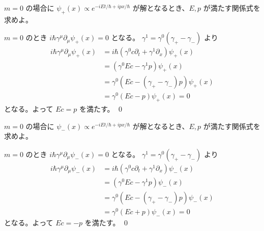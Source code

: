\documentclass[uplatex,dvipdfmx,a4paper,11pt]{jlreq}
\makeatletter
\numberwithin{equation}{section}
\theoremstyle{definition}
\renewenvironment{proof}[1][\proofname]{\par
  \normalfont
  \topsep6\p@\@plus6\p@ \trivlist
  \item[\hskip\labelsep{\bfseries #1}\@addpunct{\bfseries}]\ignorespaces\quad\par
}{%
  \qed\endtrivlist\@endpefalse
}
\renewcommand\proofname{証明}
\makeatother
\begin{document}
\begin{problem}
$m = 0$ の場合に $\psi_+(x) \propto e^{-iEt/\hbar+ipx/\hbar}$ が解となるとき、$E, p$ が満たす関係式を求めよ。
\end{problem}
\begin{proof}
  $m = 0$ のとき $i\hbar\gamma^\mu\partial_\mu\psi_+(x) = 0$ となる。 $\gamma^1 = \gamma^0(\gamma_+ - \gamma_-)$ より
  \begin{align}
    i\hbar\gamma^\mu\partial_\mu\psi_+(x) & = i\hbar(\gamma^0c\partial_t + \gamma^1\partial_x)\psi_+(x) \\
                                          & = (\gamma^0Ec - \gamma^1p)\psi_+(x)                         \\
                                          & = \gamma^0(Ec - (\gamma_+ - \gamma_-)p)\psi_+(x)            \\
                                          & = \gamma^0(Ec - p)\psi_+(x) = 0
  \end{align}
  となる。よって $Ec = p$ を満たす。
\end{proof}

\begin{problem}
$m = 0$ の場合に $\psi_-(x) \propto e^{-iEt/\hbar+ipx/\hbar}$ が解となるとき、$E, p$ が満たす関係式を求めよ。
\end{problem}
\begin{proof}
  $m = 0$ のとき $i\hbar\gamma^\mu\partial_\mu\psi_-(x) = 0$ となる。 $\gamma^1 = \gamma^0(\gamma_+ - \gamma_-)$ より
  \begin{align}
    i\hbar\gamma^\mu\partial_\mu\psi_-(x) & = i\hbar(\gamma^0c\partial_t + \gamma^1\partial_x)\psi_-(x) \\
                                          & = (\gamma^0Ec - \gamma^1p)\psi_-(x)                         \\
                                          & = \gamma^0(Ec - (\gamma_+ - \gamma_-)p)\psi_-(x)            \\
                                          & = \gamma^0(Ec + p)\psi_-(x) = 0
  \end{align}
  となる。よって $Ec = -p$ を満たす。
\end{proof}
\end{document}
